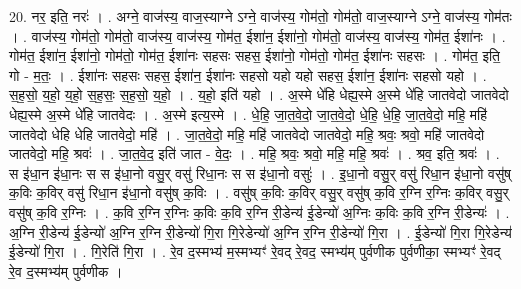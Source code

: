 \documentclass[17pt]{extarticle}
\begin{document}
20. नर॒ इति॒ नरः॑ । . अग्ने॒ वाज॑स्य॒ वाज॒स्याग्ने ऽग्ने॒ वाज॑स्य॒ गोम॑तो॒ गोम॑तो॒ वाज॒स्याग्ने ऽग्ने॒ वाज॑स्य॒ गोम॑तः । . वाज॑स्य॒ गोम॑तो॒ गोम॑तो॒ वाज॑स्य॒ वाज॑स्य॒ गोम॑त॒ ईशा॑न॒ ईशा॑नो॒ गोम॑तो॒ वाज॑स्य॒ वाज॑स्य॒ गोम॑त॒ ईशा॑नः । . गोम॑त॒ ईशा॑न॒ ईशा॑नो॒ गोम॑तो॒ गोम॑त॒ ईशा॑नः सहसः सहस॒ ईशा॑नो॒ गोम॑तो॒ गोम॑त॒ ईशा॑नः सहसः । . गोम॑त॒ इति॒ गो - म॒तः॒ । . ईशा॑नः सहसः सहस॒ ईशा॑न॒ ईशा॑नः सहसो यहो यहो सहस॒ ईशा॑न॒ ईशा॑नः सहसो यहो । . स॒ह॒सो॒ य॒हो॒ य॒हो॒ स॒ह॒सः॒ स॒ह॒सो॒ य॒हो॒ । . य॒हो॒ इति॑ यहो । . अ॒स्मे धे॑हि धेह्य॒स्मे अ॒स्मे धे॑हि जातवेदो जातवेदो धेह्य॒स्मे अ॒स्मे धे॑हि जातवेदः । . अ॒स्मे इत्य॒स्मे । . धे॒हि॒ जा॒त॒वे॒दो॒ जा॒त॒वे॒दो॒ धे॒हि॒ धे॒हि॒ जा॒त॒वे॒दो॒ महि॒ महि॑ जातवेदो धेहि धेहि जातवेदो॒ महि॑ । . जा॒त॒वे॒दो॒ महि॒ महि॑ जातवेदो जातवेदो॒ महि॒ श्रवः॒ श्रवो॒ महि॑ जातवेदो जातवेदो॒ महि॒ श्रवः॑ । . जा॒त॒वे॒द॒ इति॑ जात - वे॒दः॒ । . महि॒ श्रवः॒ श्रवो॒ महि॒ महि॒ श्रवः॑ । . श्रव॒ इति॒ श्रवः॑ । . स इ॑धा॒न इ॑धा॒नः स स इ॑धा॒नो वसु॒र् वसु॑ रिधा॒नः स स इ॑धा॒नो वसुः॑ । . इ॒धा॒नो वसु॒र् वसु॑ रिधा॒न इ॑धा॒नो वसु॑ष् क॒विः क॒विर् वसु॑ रिधा॒न इ॑धा॒नो वसु॑ष् क॒विः । . वसु॑ष् क॒विः क॒विर् वसु॒र् वसु॑ष् क॒वि र॒ग्नि र॒ग्निः क॒विर् वसु॒र् वसु॑ष् क॒वि र॒ग्निः । . क॒वि र॒ग्नि र॒ग्निः क॒विः क॒वि र॒ग्नि री॒डेन्य॑ ई॒डेन्यो॑ अ॒ग्निः क॒विः क॒वि र॒ग्नि री॒डेन्यः॑ । . अ॒ग्नि री॒डेन्य॑ ई॒डेन्यो॑ अ॒ग्नि र॒ग्नि री॒डेन्यो॑ गि॒रा गि॒रेडेन्यो॑ अ॒ग्नि र॒ग्नि री॒डेन्यो॑ गि॒रा । . ई॒डेन्यो॑ गि॒रा गि॒रेडेन्य॑ ई॒डेन्यो॑ गि॒रा । . गि॒रेति॑ गि॒रा । . रे॒व द॒स्मभ्य॑ म॒स्मभ्यꣳ॑ रे॒वद् रे॒वद॒ स्मभ्य॑म् पुर्वणीक पुर्वणीका॒ स्मभ्यꣳ॑ रे॒वद् रे॒व द॒स्मभ्य॑म् पुर्वणीक । \newline
\end{document}
